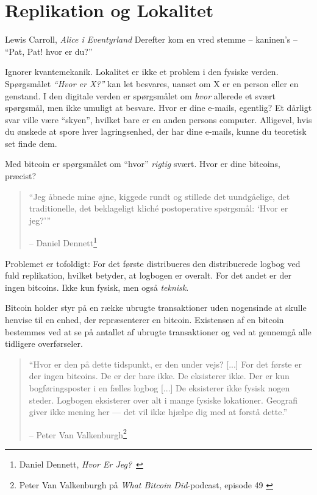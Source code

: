 \chapter{Replikation og Lokalitet}
\label{les:3}

\begin{chapquote}{Lewis Carroll, \textit{Alice i Eventyrland}}
Derefter kom en vred stemme -- kaninen's -- \enquote{Pat, Pat! hvor er du?}
\end{chapquote}

Ignorer kvantemekanik. Lokalitet er ikke et problem i den fysiske verden. 
Spørgsmålet \textit{\enquote{Hvor er X?}} kan let besvares, uanset om 
X er en person eller en genstand. I den digitale verden er spørgsmålet om 
\textit{hvor} allerede et svært spørgsmål, men ikke umuligt at besvare. Hvor er 
dine e-mails, egentlig? Et dårligt svar ville være \enquote{skyen}, hvilket 
bare er en anden persons computer. Alligevel, hvis du ønskede at spore hver 
lagringsenhed, der har dine e-mails, kunne du teoretisk set finde dem.

Med bitcoin er spørgsmålet om \enquote{hvor} \textit{rigtig} svært. Hvor er 
dine bitcoins, præcist?

\begin{quotation}\begin{samepage}
\enquote{Jeg åbnede mine øjne, kiggede rundt og stillede det uundgåelige, det 
traditionelle, det beklageligt kliché postoperative spørgsmål: `Hvor er jeg?'}
\begin{flushright} -- Daniel Dennett\footnote{Daniel Dennett, 
    \textit{Hvor Er Jeg?}~\cite{where-am-i}}
\end{flushright}\end{samepage}\end{quotation}

Problemet er tofoldigt: For det første distribueres den distribuerede logbog 
ved fuld replikation, hvilket betyder, at logbogen er overalt. For det andet 
er der ingen bitcoins. Ikke kun fysisk, men også \textit{teknisk}.

Bitcoin holder styr på en række ubrugte transaktioner uden nogensinde at 
skulle henvise til en enhed, der repræsenterer en bitcoin. Existensen af en 
bitcoin bestemmes ved at se på antallet af ubrugte transaktioner og ved at
gennemgå alle tidligere overførseler.

\begin{quotation}\begin{samepage}
\enquote{Hvor er den på dette tidspunkt, er den under vejs? [...] For det første 
er der ingen bitcoins. De er der bare ikke. De eksisterer ikke. Der er kun 
bogføringsposter i en fælles logbog [...] De eksisterer ikke fysisk nogen steder. 
Logbogen eksisterer over alt i mange fysiske lokationer. Geografi giver 
ikke mening her --- det vil ikke hjælpe dig med at forstå dette.}
\begin{flushright} -- Peter Van Valkenburgh\footnote{Peter Van Valkenburgh på 
    \textit{What Bitcoin Did}-podcast, episode 49 \cite{wbd049}}
\end{flushright}\end{samepage}\end{quotation}

